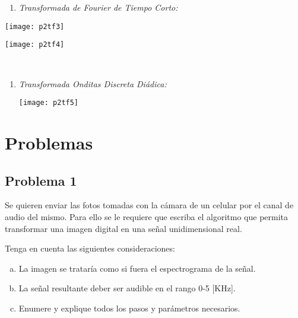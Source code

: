 \documentclass[a4paper,10pt,spanish,oneside]{article}
\begin{document}
\begin{enumerate}[3.]

\item \begin{center}
\textit{Transformada de Fourier de Tiempo Corto:}
\end{center}

\end{enumerate}

\begin{minipage}{0.5\linewidth}

\begin{center}
\texttt{[image: p2tf3]}
\end{center}

\end{minipage} \hfill \begin{minipage}{0.5\linewidth}

\begin{center}
\texttt{[image: p2tf4]}
\end{center}

\end{minipage} \\

\begin{enumerate}
\item \textit{Transformada Onditas Discreta Diádica:}

\begin{center}
\texttt{[image: p2tf5]}
\end{center}

\end{enumerate}

\section{Problemas}

\subsection{Problema 1}
Se quieren enviar las fotos tomadas con la cámara de un celular por el canal de audio del mismo. Para ello se le requiere que escriba el algoritmo que permita transformar una imagen digital en una señal unidimensional real.

Tenga en cuenta las siguientes consideraciones:

	\begin{enumerate}[a.]
	\item La imagen se trataría como si fuera el espectrograma de la señal.
	\item La señal resultante deber ser audible en el rango 0-5 [KHz].
	\item Enumere y explique todos los pasos y parámetros necesarios.
	\end{enumerate}
\end{document}
